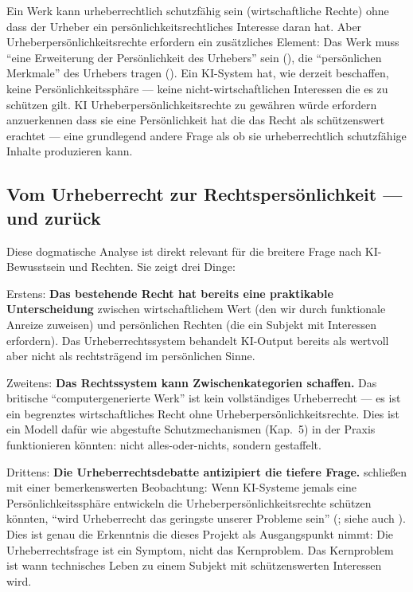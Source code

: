 \documentclass[acmcp, noacm]{acmart}
\begin{document}
Ein Werk kann urheberrechtlich schutzfähig sein (wirtschaftliche Rechte) ohne dass der Urheber ein persönlichkeitsrechtliches Interesse daran hat. Aber Urheberpersönlichkeitsrechte erfordern ein zusätzliches Element: Das Werk muss ``eine Erweiterung der Persönlichkeit des Urhebers'' sein (\cite{rigamonti2006}), die ``persönlichen Merkmale'' des Urhebers tragen (\cite{rosenthal_kwall2010}). Ein KI-System hat, wie derzeit beschaffen, keine Persönlichkeitssphäre --- keine nicht-wirtschaftlichen Interessen die es zu schützen gilt. KI Urheberpersönlichkeitsrechte zu gewähren würde erfordern anzuerkennen dass sie eine Persönlichkeit hat die das Recht als schützenswert erachtet --- eine grundlegend andere Frage als ob sie urheberrechtlich schutzfähige Inhalte produzieren kann.

\subsection{Vom Urheberrecht zur Rechtspersönlichkeit --- und zurück}

Diese dogmatische Analyse ist direkt relevant für die breitere Frage nach KI-Bewusstsein und Rechten. Sie zeigt drei Dinge:

Erstens: \textbf{Das bestehende Recht hat bereits eine praktikable Unterscheidung} zwischen wirtschaftlichem Wert (den wir durch funktionale Anreize zuweisen) und persönlichen Rechten (die ein Subjekt mit Interessen erfordern). Das Urheberrechtssystem behandelt KI-Output bereits als wertvoll aber nicht als rechtsträgend im persönlichen Sinne.

Zweitens: \textbf{Das Rechtssystem kann Zwischenkategorien schaffen.} Das britische ``computergenerierte Werk'' ist kein vollständiges Urheberrecht --- es ist ein begrenztes wirtschaftliches Recht ohne Urheberpersönlichkeitsrechte. Dies ist ein Modell dafür wie abgestufte Schutzmechanismen (Kap.~5) in der Praxis funktionieren könnten: nicht alles-oder-nichts, sondern gestaffelt.

Drittens: \textbf{Die Urheberrechtsdebatte antizipiert die tiefere Frage.} \cite{miernicki2021} schließen mit einer bemerkenswerten Beobachtung: Wenn KI-Systeme jemals eine Persönlichkeitssphäre entwickeln die Urheberpersönlichkeitsrechte schützen könnten, ``wird Urheberrecht das geringste unserer Probleme sein'' (\cite{grimmelmann2016}; siehe auch \cite{clifford1997}). Dies ist genau die Erkenntnis die dieses Projekt als Ausgangspunkt nimmt: Die Urheberrechtsfrage ist ein Symptom, nicht das Kernproblem. Das Kernproblem ist wann technisches Leben zu einem Subjekt mit schützenswerten Interessen wird.
\end{document}
